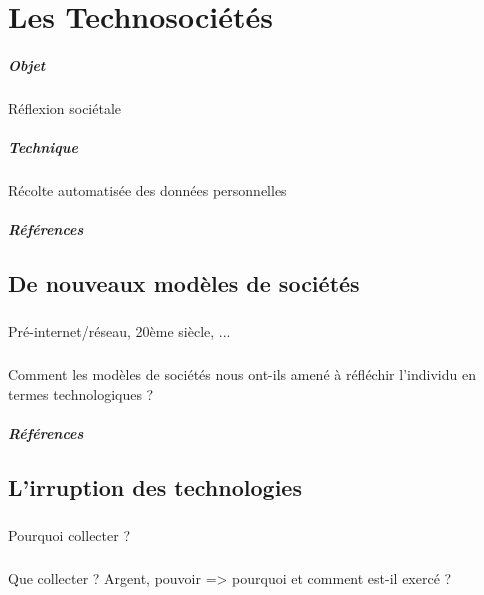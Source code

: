 \chapter{Les Technosociétés}
\paragraph{Objet} Réflexion sociétale
\paragraph{Technique} Récolte automatisée des données personnelles
\paragraph{Références}
\cite{Damasio:0}
\cite{Damasio:1}
\cite{Deleuze:0}
\cite{Foucault:0}
\cite{Huxley:0}
\cite{Klein:0}
\cite{Marx:0}
\cite{Marx:1}
\cite{Moore:0}
\cite{Negri:0}
\cite{Nietzsche:0}
\cite{Orwell:0}
\cite{Pieces:0}
\cite{Rabhi:0}
\cite{Rufin:0}
\cite{Arte:0}
\cite{GhostInTheShell}
\cite{Gunnm}
\cite{PsychoPass}

\section{De nouveaux modèles de sociétés}
\paragraph{} Pré-internet/réseau, 20ème siècle, ...
\paragraph{} Comment les modèles de sociétés nous ont-ils amené à réfléchir l'individu en termes technologiques ?
\paragraph{Références} \cite{Marx:0} \cite{Marx:1} \cite{Nietzsche:0}

\section{L'irruption des technologies}
\paragraph{} Pourquoi collecter ?
\paragraph{} Que collecter ? Argent, pouvoir => pourquoi et comment est-il exercé ? 
